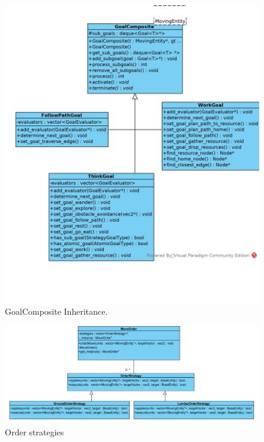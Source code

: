 \begin{figure}[!htb]
    \centering
    \includegraphics{res/GoalComposite-Inherit.jpg}
    \caption{GoalComposite Inheritance.}\label{fig:goalcomposite-inherit}
\end{figure}

\begin{figure}[!htb]
    \centering
    \includegraphics[angle=-90,origin=c,scale=0.65]
    {res/order-strategies.png}
    \caption{Order strategies}\label{fig:orderstrategies}
\end{figure}

